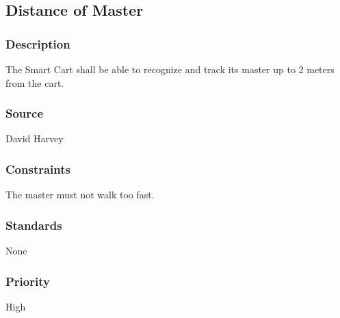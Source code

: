 \subsection{Distance of Master}
\subsubsection{Description}
The Smart Cart shall be able to recognize and track its master up to 2 meters from the cart. 
\subsubsection{Source}
David Harvey
\subsubsection{Constraints}
The master must not walk too fast.
\subsubsection{Standards}
None
\subsubsection{Priority}
High
